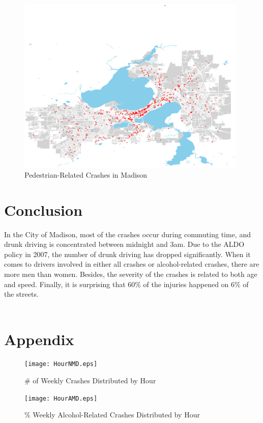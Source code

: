 \documentclass[15pt]{article}
\begin{document}
\begin{figure}[H]
\raggedleft
\includegraphics[height=85mm]{ped.eps}
\caption{Pedestrian-Related Crashes in Madison}
\end{figure}

\section{Conclusion}
In the City of Madison, most of the crashes occur during commuting time, and drunk driving is concentrated between midnight and 3am. Due to the ALDO policy in 2007, the number of drunk driving has dropped significantly. When it comes to drivers involved in either all crashes or alcohol-related crashes, there are more men than women. Besides, the severity of the crashes is related to both age and speed. Finally, it is surprising that 60\% of the injuries happened on 6\% of the streets.
~\\
~\\
\section{Appendix}
\begin{figure}[H]
\center
\texttt{[image: HourNMD.eps]}
\caption{\# of Weekly Crashes Distributed by Hour}
\label{sec:WH1}
\end{figure}

\begin{figure}[H]
\center
\texttt{[image: HourAMD.eps]}
\caption{\% Weekly Alcohol-Related Crashes Distributed by Hour}
\end{figure}
\end{document}
